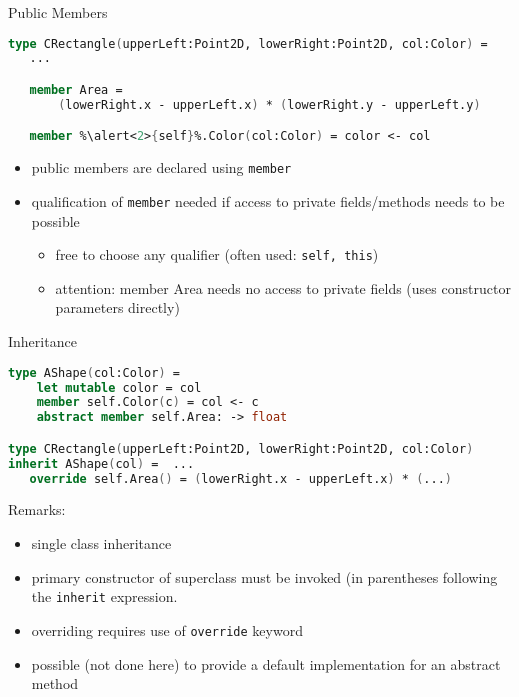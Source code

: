 \documentclass{beamer}
\newcommand{\Blue}[1]{\color{blue}#1\color{black}\xspace}
\begin{document}
\begin{frame}[fragile]{Public Members}
\begin{lstlisting}[language=FSharp, escapechar=\%]
   type CRectangle(upperLeft:Point2D, lowerRight:Point2D, col:Color) =
   ...

   member Area =
       (lowerRight.x - upperLeft.x) * (lowerRight.y - upperLeft.y)

   member %\alert<2>{self}%.Color(col:Color) = color <- col
\end{lstlisting}

\begin{overlayarea}{\textwidth}{0.3\textheight}
\begin{itemize}
 \item<+-> public members are declared using \lstinline!member!
 \item<+-> qualification of \lstinline!member! needed if access to
   private fields/methods needs to be possible
   \begin{itemize}
     \item free to choose any qualifier (often used: \lstinline!self, this!)
     \item attention: member Area needs no access to private fields
       (uses constructor parameters directly)
  \end{itemize}
\end{itemize}
\end{overlayarea}
\end{frame}

\begin{frame}[fragile]{Inheritance}
\begin{lstlisting}[language=FSharp, escapechar=\%]
type AShape(col:Color) =
    let mutable color = col
    member self.Color(c) = col <- c 
    abstract member self.Area: -> float

type CRectangle(upperLeft:Point2D, lowerRight:Point2D, col:Color) 
inherit AShape(col) =  ...
   override self.Area() = (lowerRight.x - upperLeft.x) * (...)
\end{lstlisting}

\Blue{Remarks:}
\begin{overlayarea}{\textwidth}{0.6\textheight}
\begin{itemize}
 \item<+-> single class inheritance
 \item<+-> primary constructor of superclass must be invoked (in
   parentheses following the \lstinline!inherit! expression.
 \item<+-> overriding requires use of \lstinline!override! keyword 
 \item<+-> possible (not done here) to provide a default
   implementation for an abstract method
\end{itemize}
\end{overlayarea}
\end{frame}
\end{document}
